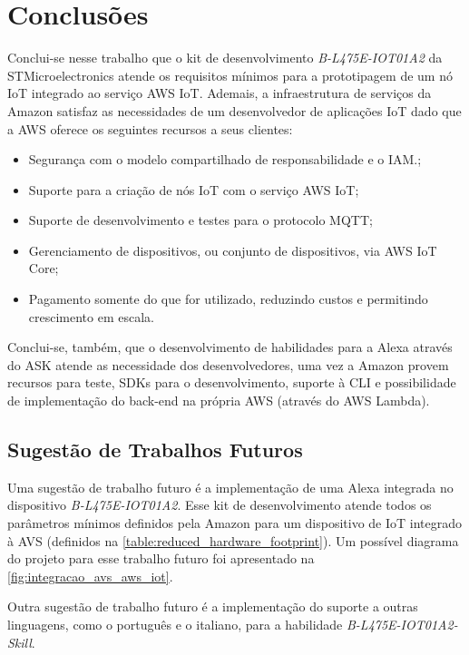 \chapter{Conclusões}\label{chapter:conclusoes}

Conclui-se nesse trabalho que o kit de desenvolvimento \textit{B-L475E-IOT01A2} da STMicroelectronics atende os requisitos mínimos para a prototipagem de um nó IoT integrado ao serviço AWS IoT. Ademais, a infraestrutura de serviços da Amazon satisfaz as necessidades de um desenvolvedor de aplicações IoT dado que a AWS oferece os seguintes recursos a seus clientes:

\begin{itemize}
	\item Segurança com o modelo compartilhado de responsabilidade e o IAM.;
	\item Suporte para a criação de nós IoT com o serviço AWS IoT;
	\item Suporte de desenvolvimento e testes para o protocolo MQTT;
	\item Gerenciamento de dispositivos, ou conjunto de dispositivos, via AWS IoT Core;
	\item Pagamento somente do que for utilizado, reduzindo custos e permitindo crescimento em escala.
\end{itemize}

Conclui-se, também, que o desenvolvimento de habilidades para a Alexa através do ASK atende as necessidade dos desenvolvedores, uma vez a Amazon provem recursos para teste, SDKs para o desenvolvimento, suporte à CLI e possibilidade de implementação do back-end na própria AWS (através do AWS Lambda).

\section{Sugestão de Trabalhos Futuros}\label{section:sugesto_de_trabalhos_futuros}

Uma sugestão de trabalho futuro é a implementação de uma Alexa integrada no dispositivo \textit{B-L475E-IOT01A2}. Esse kit de desenvolvimento atende todos os parâmetros mínimos definidos pela Amazon para um dispositivo de IoT integrado à AVS (definidos na \autoref{table:reduced_hardware_footprint}). Um possível diagrama do projeto para esse trabalho futuro foi apresentado na \autoref{fig:integracao_avs_aws_iot}.

Outra sugestão de trabalho futuro é a implementação do suporte a outras linguagens, como o português e o italiano, para a habilidade \textit{B-L475E-IOT01A2-Skill}.

